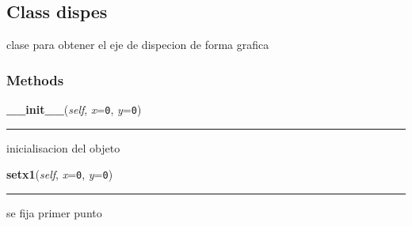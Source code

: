 \subsection{Class dispes}

    \label{astroplot_s:dispes}
clase para obtener el eje de dispecion de forma grafica



  \subsubsection{Methods}

    \label{astroplot_s:dispes:__init__}

    \vspace{0.5ex}

\hspace{.8\funcindent}\begin{boxedminipage}{\funcwidth}

    \raggedright \textbf{\_\_init\_\_}(\textit{self}, \textit{x}={\tt 0}, \textit{y}={\tt 0})

    \vspace{-1.5ex}

    \rule{\textwidth}{0.5\fboxrule}
\setlength{\parskip}{2ex}
    inicialisacion del objeto

\setlength{\parskip}{1ex}
    \end{boxedminipage}

    \label{astroplot_s:dispes:setx1}

    \vspace{0.5ex}

\hspace{.8\funcindent}\begin{boxedminipage}{\funcwidth}

    \raggedright \textbf{setx1}(\textit{self}, \textit{x}={\tt 0}, \textit{y}={\tt 0})

    \vspace{-1.5ex}

    \rule{\textwidth}{0.5\fboxrule}
\setlength{\parskip}{2ex}
    se fija primer punto

\setlength{\parskip}{1ex}
    \end{boxedminipage}

